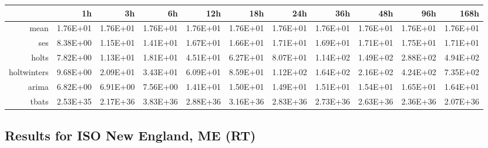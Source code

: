 \begin{landscape}
\begin{table}[ht]
\begin{tabular}{rrrrrrrrrrr}
   \hline
\end{tabular}
\end{table}
\begin{table}[ht]
\centering
\begin{tabular}{rrrrrrrrrrr}
  \hline
 & 1h & 3h & 6h & 12h & 18h & 24h & 36h & 48h & 96h & 168h \\ 
  \hline
mean & 1.76E+01 & 1.76E+01 & 1.76E+01 & 1.76E+01 & 1.76E+01 & 1.76E+01 & 1.76E+01 & 1.76E+01 & 1.76E+01 & 1.76E+01 \\ 
  ses & 8.38E+00 & 1.15E+01 & 1.41E+01 & 1.67E+01 & 1.66E+01 & 1.71E+01 & 1.69E+01 & 1.71E+01 & 1.75E+01 & 1.71E+01 \\ 
  holts & 7.82E+00 & 1.13E+01 & 1.81E+01 & 4.51E+01 & 6.27E+01 & 8.07E+01 & 1.14E+02 & 1.49E+02 & 2.88E+02 & 4.94E+02 \\ 
  holtwinters & 9.68E+00 & 2.09E+01 & 3.43E+01 & 6.09E+01 & 8.59E+01 & 1.12E+02 & 1.64E+02 & 2.16E+02 & 4.24E+02 & 7.35E+02 \\ 
  arima & 6.82E+00 & 6.91E+00 & 7.56E+00 & 1.41E+01 & 1.50E+01 & 1.49E+01 & 1.51E+01 & 1.54E+01 & 1.65E+01 & 1.64E+01 \\ 
  tbats & 2.53E+35 & 2.17E+36 & 3.83E+36 & 2.88E+36 & 3.16E+36 & 2.83E+36 & 2.73E+36 & 2.63E+36 & 2.36E+36 & 2.07E+36 \\ 
   \hline
\end{tabular}
\end{table}


\subsection{Results for ISO New England, ME (RT)}


\end{landscape}
